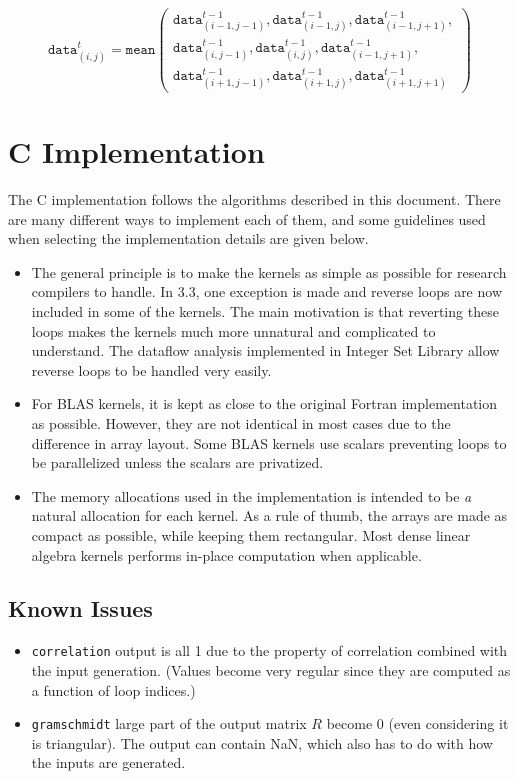 \documentclass{article}
\begin{document}
\[\mathtt{data}^{t}_{(i,j)} = \mathtt{mean}\left(
\begin{array}{c}
   \mathtt{data}^{t-1}_{(i-1,j-1)}, \mathtt{data}^{t-1}_{(i-1,j)},  \mathtt{data}^{t-1}_{(i-1,j+1)}, \\
   \mathtt{data}^{t-1}_{(i,j-1)}, \mathtt{data}^{t-1}_{(i,j)},  \mathtt{data}^{t-1}_{(i-1,j+1)}, \\
    \mathtt{data}^{t-1}_{(i+1,j-1)}, \mathtt{data}^{t-1}_{(i+1,j)}, \mathtt{data}^{t-1}_{(i+1,j+1)}
\end{array}\right)\]

\section{C Implementation}
The C implementation follows the algorithms described in this document. There are many different ways
to implement each of them, and some guidelines used when selecting the implementation details are given below.


\begin{itemize}
\item The general principle is to make the kernels as simple as possible for
research compilers to handle.  In 3.3, one exception is made and reverse loops
are now included in some of the kernels. The main motivation is that reverting
these loops makes the kernels much more unnatural and complicated to
understand. The dataflow analysis implemented in Integer Set Library allow
reverse loops to be handled very easily. 
\item For BLAS kernels, it is kept as close to the original Fortran implementation as possible. 
However, they are not identical in most cases due to the difference in array layout. Some BLAS
kernels use scalars preventing loops to be parallelized unless the scalars are privatized.
\item The memory allocations used in the implementation is intended to be
\emph{a} natural allocation for each kernel. As a rule of thumb, the
arrays are made as compact as possible, while keeping them rectangular.
Most dense linear algebra kernels performs in-place computation when applicable.
\end{itemize}

\subsection*{Known Issues}
\begin{itemize}
\item {\tt correlation} output is all 1 due to the property of correlation
combined with the input generation. (Values become very regular since they are
computed as a function of loop indices.)
\item {\tt gramschmidt} large part of the output matrix $R$ become 0 (even
considering it is triangular). The output can contain NaN, which also has to do
with how the inputs are generated.
\end{itemize}
\end{document}
